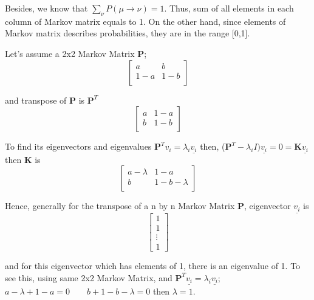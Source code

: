 \documentclass[12pt,fleqn]{report}
\begin{document}
\begin{enumerate}


Besides, we know that $\sum\limits_{\nu} P(\mu \rightarrow \nu) = 1 $. Thus, sum of all elements in each column of Markov matrix equals to 1. On the other hand, since elements of Markov matrix describes probabilities, they are in the range [0,1]. 


Let's assume a 2x2 Markov Matrix \textbf{P}; 
\[\begin{bmatrix}
a&b\\
1-a&1-b\\  
\end{bmatrix}\]

and transpose of \textbf{P} is $\textbf{P}^T$
\[\begin{bmatrix}
a&1-a\\
b&1-b\\  
\end{bmatrix}\]

To find its eigenvectors and eigenvalues  $\textbf{P}^T v_i = \lambda_i \underline{v_i} $ then, ($\textbf{P}^T - \lambda_i I) \underline{v_i}  =0  = \textbf{K} \underline{v_i} $ then \textbf{K} is
\[\begin{bmatrix}
a-\lambda&1-a\\                   
b&1-b-\lambda\\  
\end{bmatrix}\]

Hence, generally for the transpose of a n by n Markov Matrix $\textbf{P}$, eigenvector $\underline{v_i} $ is
\[\begin{bmatrix}
1\\ 
1\\ 
\vdots\\ 
1 
\end{bmatrix}\]

and for this eigenvector which has elements of 1, there is an eigenvalue of 1. To see this, using same 2x2 Markov Matrix, and $\textbf{P}^T \underline{v_i} = \lambda_i \underline{v_i} $;
$ a - \lambda + 1 - a = 0 \qquad b + 1 - b - \lambda = 0 $ then $\lambda =1 $.


\end{enumerate}
\end{document}
